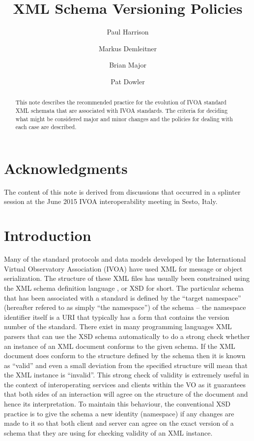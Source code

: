 \documentclass[10pt,a4paper]{ivoa}
\title{XML Schema Versioning Policies}
\author[http://www.ivoa.net/cgi-bin/twiki/bin/view/IVOA/PaulHarrison]{Paul Harrison}
\author[http://www.ivoa.net/cgi-bin/twiki/bin/view/IVOA/MarkusDemleitner]{Markus Demleitner}
\author[http://www.ivoa.net/cgi-bin/twiki/bin/view/IVOA/BrianMajor]{Brian Major}
\author[http://www.ivoa.net/cgi-bin/twiki/bin/view/IVOA/PatDowler]{Pat Dowler}
\begin{document}
\begin{abstract}
This note describes the recommended practice for the evolution of IVOA
standard XML schemata that are associated with IVOA standards.  The criteria for
deciding what might be considered major and minor changes and the policies for dealing with each case are described.
\end{abstract}



\section*{Acknowledgments}

The content of this note is derived from discussions that occurred in a splinter
session at the June 2015 IVOA interoperability meeting in Sesto, Italy.

\section{Introduction}

Many of the standard protocols and data models developed by
the International Virtual Observatory Association (IVOA) have used XML
\citep{std:XML} for message or object serialization. The structure of
these XML files has
usually been constrained using the XML schema definition language
\citep{std:XSD}, or XSD for short.
The particular schema that has been associated with a standard
is defined by the ``target namespace'' (hereafter refered to as simply ``the
namespace'') of the schema -- the namespace identifier itself is a URI that
typically has a form that contains the version number of the standard. There
exist in many programming languages XML parsers that can use the XSD schema
automatically to do a strong check whether an instance of an XML
document conforms to the given schema. If the XML document does conform to the
structure defined by the schema then it is known as ``valid'' and even a small
deviation from the specified structure will mean that the XML instance is
``invalid''. This strong check of validity is extremely useful in the context of
interoperating services and clients within the VO as it guarantees that both
sides of an interaction will agree on the structure of the document and
hence its interpretation. To maintain
this behaviour, the conventional XSD practice is to give the schema a new
identity (namespace) if any changes are made to it so that both client and
server can agree on the exact version of a schema that they are using for
checking validity of an XML instance.
\end{document}
